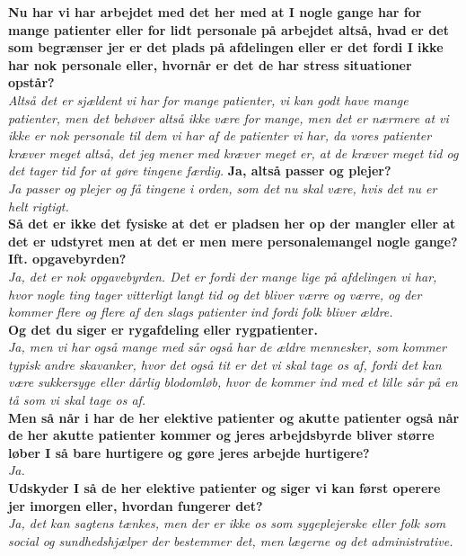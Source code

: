 \noindent
\textbf{Nu har vi har arbejdet med det her med at I nogle gange har for mange patienter eller for lidt personale på arbejdet altså, hvad er det som begrænser jer er det plads på afdelingen eller er det fordi I ikke har nok personale eller, hvornår er det de har stress situationer opstår?}\\
\noindent
\textit{Altså det er sjældent vi har for mange patienter, vi kan godt have mange patienter, men det behøver altså ikke være for mange, men det er nærmere at vi ikke er nok personale til dem vi har af de patienter vi har, da vores patienter kræver meget altså, det jeg mener med kræver meget er, at de kræver meget tid og det tager tid for at gøre tingene færdig. } 
\textbf{Ja, altså passer og plejer?}\\
\noindent
\textit{Ja passer og plejer og få tingene i orden, som det nu skal være, hvis det nu er helt rigtigt.}\\
\noindent
\textbf{Så det er ikke det fysiske at det er pladsen her op der mangler eller at det er udstyret men at det er men mere personalemangel nogle gange? Ift. opgavebyrden?}\\
\noindent
\textit{Ja, det er nok opgavebyrden. Det er fordi der mange lige på afdelingen vi har, hvor nogle ting tager vitterligt langt tid og det bliver værre og værre, og der kommer flere og flere af den slags patienter ind fordi folk bliver ældre.}\\
\noindent
\textbf{Og det du siger er rygafdeling eller rygpatienter.}\\
\noindent
\textit{ Ja, men vi har også mange med sår også har de ældre mennesker, som kommer typisk andre skavanker, hvor det også tit er det vi skal tage os af, fordi det kan være sukkersyge eller dårlig blodomløb, hvor de kommer ind med et lille sår på en tå som vi skal tage os af.}\\
\noindent
\textbf{Men så når i har de her elektive patienter og akutte patienter også når de her akutte patienter kommer og jeres arbejdsbyrde bliver større løber I så bare hurtigere og gøre jeres arbejde hurtigere?}\\
\noindent
\textit{Ja.}\\
\noindent
\textbf{Udskyder I så de her elektive patienter og siger vi kan først operere jer imorgen eller, hvordan fungerer det?}\\
\noindent
\textit{Ja, det kan sagtens tænkes, men der er ikke os som sygeplejerske eller folk som social og sundhedshjælper der bestemmer det, men lægerne og det administrative.}\\
